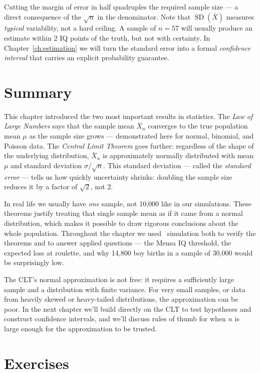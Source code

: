 Cutting the margin of error in half quadruples the required sample size --- a
direct consequence of the $\sqrt{n}$ in the denominator.  Note that
$\operatorname{SD}(\bar{X})$ measures \emph{typical} variability, not a
hard ceiling.  A sample of $n = 57$ will usually produce an estimate
within 2 IQ points of the truth, but not with certainty.  In
Chapter~\ref{ch:estimation} we will turn the standard error into a formal
\emph{confidence interval} that carries an explicit probability guarantee.

\section{Summary}
This chapter introduced the two most important results in statistics.
The \emph{Law of Large Numbers} says that the sample mean
$\bar{X}_n$ converges to the true population mean $\mu$ as the sample size
grows --- demonstrated here for normal, binomial, and Poisson data.
The \emph{Central Limit Theorem} goes further: regardless of the shape of
the underlying distribution, $\bar{X}_n$ is approximately normally
distributed with mean $\mu$ and standard deviation $\sigma/\sqrt{n}$.
This standard deviation --- called the \emph{standard error} --- tells us
how quickly uncertainty shrinks: doubling the sample size reduces it by a
factor of $\sqrt{2}$, not 2.

In real life we usually have \emph{one} sample, not 10,000 like in our
simulations. These theorems justify treating that single sample mean as if
it came from a normal distribution, which makes it possible to draw
rigorous conclusions about the whole population.  Throughout the chapter
we used \R\ simulation both to verify the theorems and to answer applied
questions --- the Mensa IQ threshold, the expected loss at roulette, and
why 14,800 boy births in a sample of 30,000 would be surprisingly low.

The CLT's normal approximation is not free: it requires a sufficiently
large sample and a distribution with finite variance. For very small
samples, or data from heavily skewed or heavy-tailed distributions, the
approximation can be poor. In the next chapter we'll build directly on the
CLT to test hypotheses and construct confidence intervals, and we'll
discuss rules of thumb for when $n$ is large enough for the approximation
to be trusted.

\section{Exercises}

